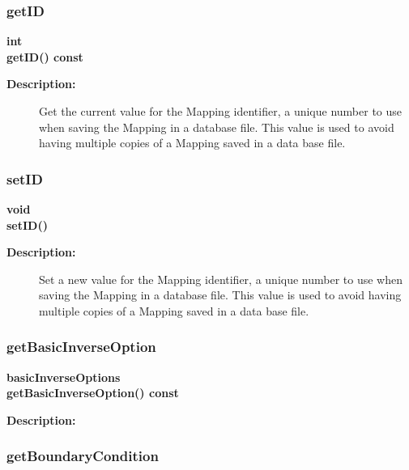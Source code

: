 \subsubsection{getID}
 
\begin{flushleft} \textbf{%
int  \\ 
\settowidth{\MappingIncludeArgIndent}{getID(}%
getID() const 
}\end{flushleft}
\begin{description}
\item[{\bf Description:}] 
   Get the current value for the Mapping identifier, a unique number to use when
  saving the Mapping in a database file. This value is used to avoid having
 multiple copies of a Mapping saved in a data base file.  
\end{description}
\subsubsection{setID}
 
\begin{flushleft} \textbf{%
void  \\ 
\settowidth{\MappingIncludeArgIndent}{setID(}%
setID() 
}\end{flushleft}
\begin{description}
\item[{\bf Description:}] 
   Set a new value for the Mapping identifier, a unique number to use when
  saving the Mapping in a database file. This value is used to avoid having
 multiple copies of a Mapping saved in a data base file.  
\end{description}
\subsubsection{getBasicInverseOption}
 
\begin{flushleft} \textbf{%
basicInverseOptions  \\ 
\settowidth{\MappingIncludeArgIndent}{getBasicInverseOption(}%
getBasicInverseOption() const
}\end{flushleft}
\begin{description}
\item[{\bf Description:}] 
\end{description}
\subsubsection{getBoundaryCondition}
 
